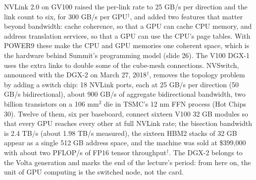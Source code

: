 \documentclass[11pt,letterpaper]{article}
\begin{document}
NVLink 2.0 on GV100 raised the per-link rate to 25 GB/s per direction and the link count to six, for 300 GB/s per GPU$^\dagger$, and added two features that matter beyond bandwidth: cache coherence, so that a GPU can cache CPU memory, and address translation services, so that a GPU can use the CPU's page tables. With POWER9 these make the CPU and GPU memories one coherent space, which is the hardware behind Summit's programming model (slide 26). The V100 DGX-1 uses the extra links to double some of the cube-mesh connections. NVSwitch, announced with the DGX-2 on March 27, 2018$^\dagger$, removes the topology problem by adding a switch chip: 18 NVLink ports, each at 25 GB/s per direction (50 GB/s bidirectional), about 900 GB/s of aggregate bidirectional bandwidth, two billion transistors on a 106 mm$^2$ die in TSMC's 12 nm FFN process (Hot Chips 30). Twelve of them, six per baseboard, connect sixteen V100 32 GB modules so that every GPU reaches every other at full NVLink rate; the bisection bandwidth is 2.4 TB/s (about 1.98 TB/s measured), the sixteen HBM2 stacks of 32 GB appear as a single 512 GB address space, and the machine was sold at \$399,000 with about two PFLOP/s of FP16 tensor throughput$^\dagger$. The DGX-2 belongs to the Volta generation and marks the end of the lecture's period: from here on, the unit of GPU computing is the switched node, not the card.
\end{document}
